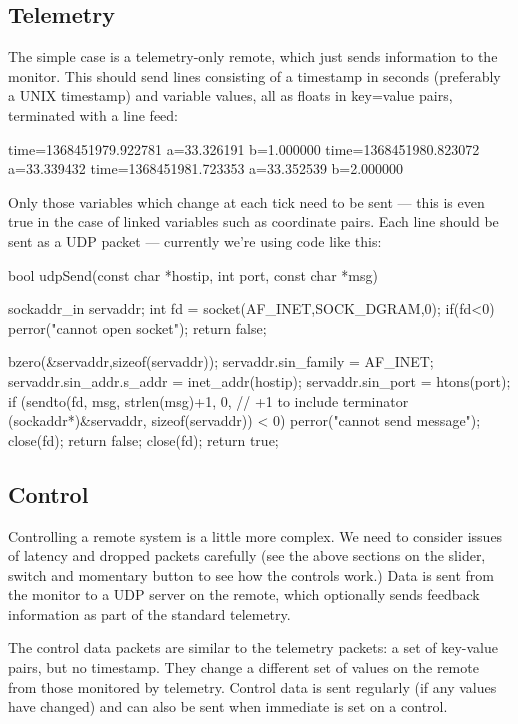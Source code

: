 \subsection{Telemetry}
The simple case is a telemetry-only remote, which just sends information to the monitor. This should send lines consisting
of a timestamp in seconds (preferably a UNIX timestamp) and variable values, all as floats in key=value pairs, terminated with
a line feed:
\begin{v}
time=1368451979.922781 a=33.326191 b=1.000000
time=1368451980.823072 a=33.339432
time=1368451981.723353 a=33.352539 b=2.000000
\end{v}
Only those variables which change at each tick need to be sent --- this is even true in the case of linked variables such as coordinate
pairs. Each line should be sent as a UDP packet --- currently we're using code like this:
\begin{v}
bool udpSend(const char *hostip, int port, const char *msg){
    sockaddr_in servaddr;
    int fd = socket(AF_INET,SOCK_DGRAM,0);
    if(fd<0){
        perror("cannot open socket");
        return false;
    }
    
    bzero(&servaddr,sizeof(servaddr));
    servaddr.sin_family = AF_INET;
    servaddr.sin_addr.s_addr = inet_addr(hostip);
    servaddr.sin_port = htons(port);
    if (sendto(fd, msg, strlen(msg)+1, 0, // +1 to include terminator
               (sockaddr*)&servaddr, sizeof(servaddr)) < 0){
        perror("cannot send message");
        close(fd);
        return false;
    }
    close(fd);
    return true;
}
\end{v}

\subsection{Control}
Controlling a remote system is a little more complex. We need to consider issues of latency and dropped packets carefully (see
the above sections on the slider, switch and momentary button to see how the controls work.) Data is sent from the monitor
to a UDP server on the remote, which optionally sends feedback information as part of the standard telemetry.

The control data packets are similar to the telemetry packets: a set of
key-value pairs, but no timestamp. They change a different set of values on
the remote from those monitored by telemetry. Control data is sent regularly
(if any values have changed) and can also be sent when immediate is set on a
control.

